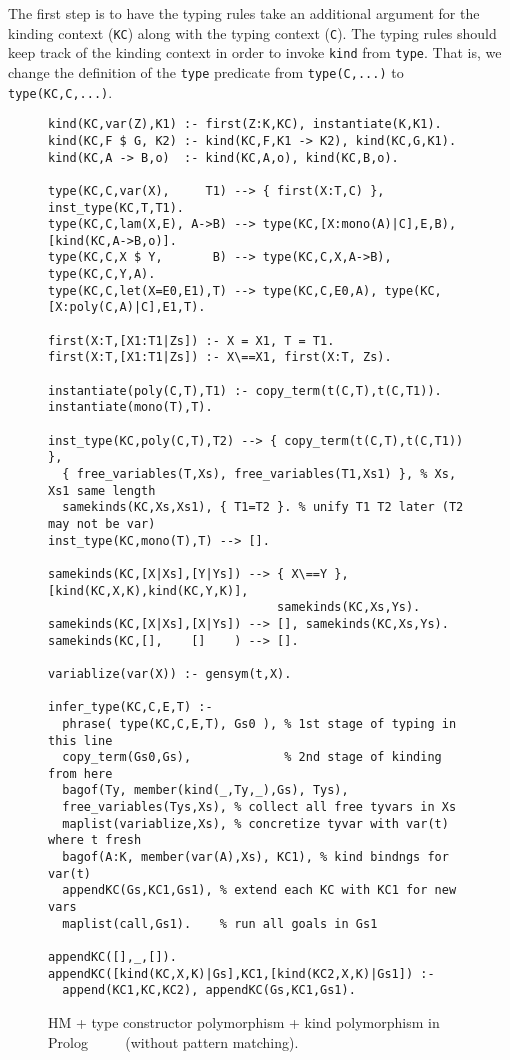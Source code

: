 \documentclass[runningheads,a4paper]{llncs}
\begin{document}
The first step is to have the typing rules take an additional argument for
the kinding context (\verb|KC|) along with the typing context (\verb|C|).
The typing rules
should keep track of the kinding context in order to invoke \verb|kind|
from \verb|type|.  That is, we change the definition of the \verb|type|
predicate from \verb|type(C,...)| to \verb|type(KC,C,...)|.

\begin{figure} %
\begin{verbatim}
kind(KC,var(Z),K1) :- first(Z:K,KC), instantiate(K,K1).
kind(KC,F $ G, K2) :- kind(KC,F,K1 -> K2), kind(KC,G,K1).
kind(KC,A -> B,o)  :- kind(KC,A,o), kind(KC,B,o).

type(KC,C,var(X),     T1) --> { first(X:T,C) }, inst_type(KC,T,T1).
type(KC,C,lam(X,E), A->B) --> type(KC,[X:mono(A)|C],E,B), [kind(KC,A->B,o)].
type(KC,C,X $ Y,       B) --> type(KC,C,X,A->B), type(KC,C,Y,A).
type(KC,C,let(X=E0,E1),T) --> type(KC,C,E0,A), type(KC,[X:poly(C,A)|C],E1,T).

first(X:T,[X1:T1|Zs]) :- X = X1, T = T1.
first(X:T,[X1:T1|Zs]) :- X\==X1, first(X:T, Zs).

instantiate(poly(C,T),T1) :- copy_term(t(C,T),t(C,T1)).
instantiate(mono(T),T).

inst_type(KC,poly(C,T),T2) --> { copy_term(t(C,T),t(C,T1)) }, 
  { free_variables(T,Xs), free_variables(T1,Xs1) }, % Xs, Xs1 same length
  samekinds(KC,Xs,Xs1), { T1=T2 }. % unify T1 T2 later (T2 may not be var)
inst_type(KC,mono(T),T) --> [].

samekinds(KC,[X|Xs],[Y|Ys]) --> { X\==Y }, [kind(KC,X,K),kind(KC,Y,K)],
                                samekinds(KC,Xs,Ys).
samekinds(KC,[X|Xs],[X|Ys]) --> [], samekinds(KC,Xs,Ys).
samekinds(KC,[],    []    ) --> [].

variablize(var(X)) :- gensym(t,X).

infer_type(KC,C,E,T) :-
  phrase( type(KC,C,E,T), Gs0 ), % 1st stage of typing in this line
  copy_term(Gs0,Gs),             % 2nd stage of kinding from here
  bagof(Ty, member(kind(_,Ty,_),Gs), Tys),
  free_variables(Tys,Xs), % collect all free tyvars in Xs
  maplist(variablize,Xs), % concretize tyvar with var(t) where t fresh
  bagof(A:K, member(var(A),Xs), KC1), % kind bindngs for var(t)
  appendKC(Gs,KC1,Gs1), % extend each KC with KC1 for new vars
  maplist(call,Gs1).    % run all goals in Gs1

appendKC([],_,[]).
appendKC([kind(KC,X,K)|Gs],KC1,[kind(KC2,X,K)|Gs1]) :-
  append(KC1,KC,KC2), appendKC(Gs,KC1,Gs1).
\end{verbatim}
\caption{HM + type constructor polymorphism + kind polymorphism in Prolog
        $\qquad$
        (without pattern matching).}
\label{fig:HMtck}
\end{figure}
\end{document}
